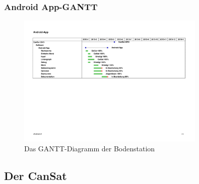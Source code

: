 \subsubsection {Android App-GANTT}
\begin{figure}[H]
	\centering
	\includegraphics[trim = 30mm 200mm 45mm 40mm, clip,width=0.8\textwidth]{8_Anhang/android-app-gantt-1.png}
	\caption{Das GANTT-Diagramm der Bodenstation}
	\label{gantt_hardware_3}
\end{figure}
\newpage
\vspace{-2cm}
\subsection{Der CanSat}

